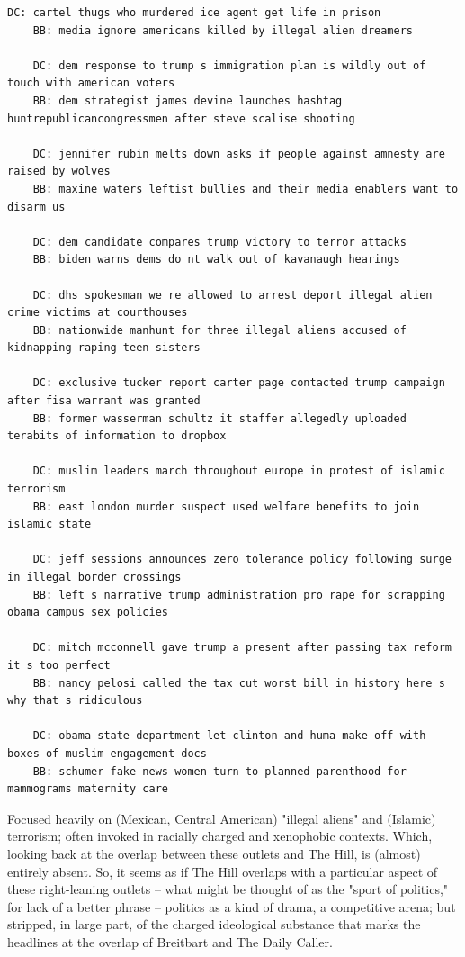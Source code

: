 \documentclass{scrartcl}
\begin{document}
\begin{lstlisting}[basicstyle=\tiny\hlfont]
    DC: cartel thugs who murdered ice agent get life in prison
    BB: media ignore americans killed by illegal alien dreamers

    DC: dem response to trump s immigration plan is wildly out of touch with american voters
    BB: dem strategist james devine launches hashtag huntrepublicancongressmen after steve scalise shooting

    DC: jennifer rubin melts down asks if people against amnesty are raised by wolves
    BB: maxine waters leftist bullies and their media enablers want to disarm us

    DC: dem candidate compares trump victory to terror attacks
    BB: biden warns dems do nt walk out of kavanaugh hearings

    DC: dhs spokesman we re allowed to arrest deport illegal alien crime victims at courthouses
    BB: nationwide manhunt for three illegal aliens accused of kidnapping raping teen sisters

    DC: exclusive tucker report carter page contacted trump campaign after fisa warrant was granted
    BB: former wasserman schultz it staffer allegedly uploaded terabits of information to dropbox

    DC: muslim leaders march throughout europe in protest of islamic terrorism
    BB: east london murder suspect used welfare benefits to join islamic state

    DC: jeff sessions announces zero tolerance policy following surge in illegal border crossings
    BB: left s narrative trump administration pro rape for scrapping obama campus sex policies

    DC: mitch mcconnell gave trump a present after passing tax reform it s too perfect
    BB: nancy pelosi called the tax cut worst bill in history here s why that s ridiculous

    DC: obama state department let clinton and huma make off with boxes of muslim engagement docs
    BB: schumer fake news women turn to planned parenthood for mammograms maternity care
\end{lstlisting}

Focused heavily on (Mexican, Central American) "illegal aliens" and (Islamic) terrorism; often invoked in racially charged and xenophobic contexts. Which, looking back at the overlap between these outlets and The Hill, is (almost) entirely absent. So, it seems as if The Hill overlaps with a particular aspect of these right-leaning outlets -- what might be thought of as the "sport of politics," for lack of a better phrase -- politics as a kind of drama, a competitive arena; but stripped, in large part, of the charged ideological substance that marks the headlines at the overlap of Breitbart and The Daily Caller.
\end{document}
